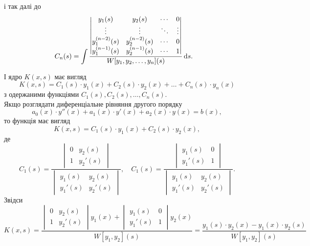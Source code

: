 і так далі до
\begin{align*}
	C_n(s) &= \int \frac{\begin{vmatrix} y_1(s) & y_2(s) & \cdots & 0 \\ \vdots & \vdots & \ddots & \vdots \\ y_1^{(n - 2)}(s) & y_2^{(n - 2)}(s) & \cdots & 0 \\ y_1^{(n - 1)}(s) & y_2^{(n - 1)}(s) & \cdots & 1 \end{vmatrix}}{W[y_1, y_2, \ldots, y_n](s)} \mathop{}\!\mathrm{d} s.
\end{align*}
 
І ядро $K(x, s)$ має вигляд
\begin{equation*}
	K(x, s) = C_1(s) \cdot y_1(x) + C_2(s) \cdot y_2(x) + \ldots + C_n(s) \cdot y_n(x)
\end{equation*}
з одержаними функціями $C_1(s), C_2(s), \ldots, C_n(s)$. \\

Якщо розглядати диференціальне рівняння другого порядку 
\begin{equation*}
	a_0(x) \cdot y''(x) + a_1(x) \cdot y'(x) + a_2(x) \cdot y(x) = b(x),
\end{equation*}
то функція  має вигляд
\begin{equation*}
	K(x, s) = C_1(s) \cdot y_1(x) + C_2(s) \cdot y_2(x),
\end{equation*}
де
\begin{equation*}
	C_1(s) = \frac{\begin{vmatrix} 0 & y_2(s) \\ 1 & y_2'(s) \end{vmatrix}}{\begin{vmatrix} y_1(s) & y_2(s) \\ y_1'(s) & y_2'(s) \end{vmatrix}}, \quad C_1(s) = \frac{\begin{vmatrix} y_1(s) & 0 \\ y_1'(s) & 1 \end{vmatrix}}{\begin{vmatrix} y_1(s) & y_2(s) \\ y_1'(s) & y_2'(s) \end{vmatrix}}.
\end{equation*}
Звідси
\begin{equation*}
	K(x, s) = \frac{\begin{vmatrix} 0 & y_2(s) \\ 1 & y_2'(s) \end{vmatrix} y_1(x) + \begin{vmatrix} y_1(s) & 0 \\ y_1'(s) & 1 \end{vmatrix} y_2(x) }{W[y_1, y_2](s)} = \frac{y_1(s) \cdot y_2(x) - y_1(x) \cdot y_2(s)}{W[y_1, y_2](s)}
\end{equation*}
